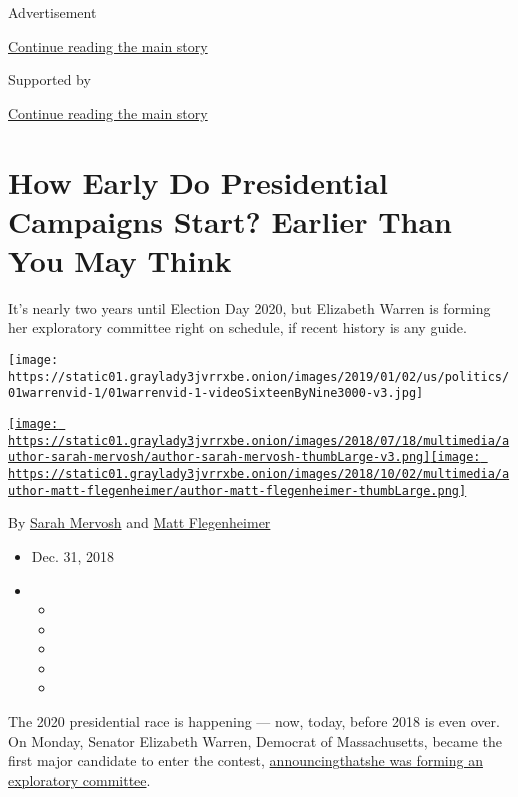 Advertisement

\protect\hyperlink{after-top}{Continue reading the main story}

Supported by

\protect\hyperlink{after-sponsor}{Continue reading the main story}

\hypertarget{how-early-do-presidential-campaigns-start-earlier-than-you-may-think}{%
\section{How Early Do Presidential Campaigns Start? Earlier Than You May
Think}\label{how-early-do-presidential-campaigns-start-earlier-than-you-may-think}}

It's nearly two years until Election Day 2020, but Elizabeth Warren is
forming her exploratory committee right on schedule, if recent history
is any guide.

\texttt{[image: https://static01.graylady3jvrrxbe.onion/images/2019/01/02/us/politics/01warrenvid-1/01warrenvid-1-videoSixteenByNine3000-v3.jpg]}

\href{https://www.nytimes3xbfgragh.onion/by/sarah-mervosh}{\texttt{[image: https://static01.graylady3jvrrxbe.onion/images/2018/07/18/multimedia/author-sarah-mervosh/author-sarah-mervosh-thumbLarge-v3.png]}}\href{https://www.nytimes3xbfgragh.onion/by/matt-flegenheimer}{\texttt{[image: https://static01.graylady3jvrrxbe.onion/images/2018/10/02/multimedia/author-matt-flegenheimer/author-matt-flegenheimer-thumbLarge.png]}}

By \href{https://www.nytimes3xbfgragh.onion/by/sarah-mervosh}{Sarah
Mervosh} and
\href{https://www.nytimes3xbfgragh.onion/by/matt-flegenheimer}{Matt
Flegenheimer}

\begin{itemize}
\item
  Dec. 31, 2018
\item
  \begin{itemize}
  \item
  \item
  \item
  \item
  \item
  \end{itemize}
\end{itemize}

The 2020 presidential race is happening --- now, today, before 2018 is
even over. On Monday, Senator Elizabeth Warren, Democrat of
Massachusetts, became the first major candidate to enter the contest,
\href{https://www.nytimes3xbfgragh.onion/2018/12/31/us/politics/elizabeth-warren-2020-president-announcement.html}{announcing}\href{https://www.nytimes3xbfgragh.onion/2018/12/31/us/politics/elizabeth-warren-2020-president-announcement.html}{that}\href{https://www.nytimes3xbfgragh.onion/2018/12/31/us/politics/elizabeth-warren-2020-president-announcement.html}{she
was forming an exploratory committee}.


